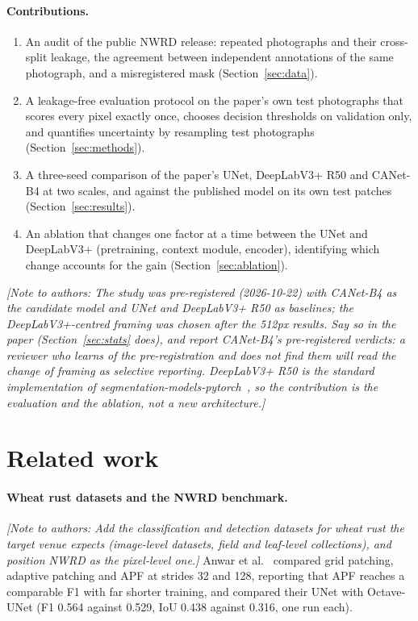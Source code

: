 \documentclass[11pt,a4paper]{article}
\newcommand{\note}[1]{\textcolor{blue!60!black}{\textit{[Note to authors: #1]}}}
\begin{document}
\paragraph{Contributions.}
\begin{enumerate}
  \item An audit of the public NWRD release: repeated photographs and their cross-split leakage,
  the agreement between independent annotations of the same photograph, and a misregistered mask
  (Section~\ref{sec:data}).
  \item A leakage-free evaluation protocol on the paper's own test photographs that scores every
  pixel exactly once, chooses decision thresholds on validation only, and quantifies uncertainty by
  resampling test photographs (Section~\ref{sec:methods}).
  \item A three-seed comparison of the paper's UNet, DeepLabV3+ R50 and CANet-B4 at two scales, and
  against the published model on its own test patches (Section~\ref{sec:results}).
  \item An ablation that changes one factor at a time between the UNet and DeepLabV3+ (pretraining,
  context module, encoder), identifying which change accounts for the gain
  (Section~\ref{sec:ablation}).
\end{enumerate}

\note{The study was pre-registered (2026-10-22) with CANet-B4 as the candidate model and UNet and
DeepLabV3+ R50 as baselines; the DeepLabV3+-centred framing was chosen after the 512px results. Say
so in the paper (Section~\ref{sec:stats} does), and report CANet-B4's pre-registered verdicts: a
reviewer who learns of the pre-registration and does not find them will read the change of framing
as selective reporting. DeepLabV3+ R50 is the standard implementation of
segmentation-models-pytorch~\cite{iakubovskii2019smp}, so the contribution is the evaluation and
the ablation, not a new architecture.}

\section{Related work}
\label{sec:related}

\paragraph{Wheat rust datasets and the NWRD benchmark.} \note{Add the classification and detection
datasets for wheat rust the target venue expects (image-level datasets, field and leaf-level
collections), and position NWRD as the pixel-level one.} Anwar et al.~\cite{anwar2023nwrd} compared
grid patching, adaptive patching and APF at strides 32 and 128, reporting that APF reaches a
comparable F1 with far shorter training, and compared their UNet with Octave-UNet (F1 0.564 against
0.529, IoU 0.438 against 0.316, one run each).
\end{document}
